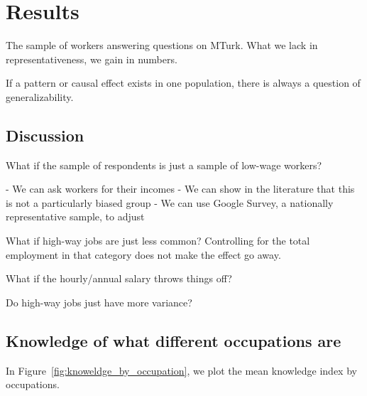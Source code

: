 \documentclass[11pt]{article}
\begin{document}

% 

\section{Results}

The sample of workers answering questions on MTurk. 
What we lack in representativeness, we gain in numbers. 

If a pattern or causal effect exists in one population, there is always a question of generalizability. 

\subsection{Discussion} 
What if the sample of respondents is just a sample of low-wage workers? 

- We can ask workers for their incomes 
- We can show in the literature that this is not a particularly biased group 
- We can use Google Survey, a nationally representative sample, to adjust 

What if high-way jobs are just less common?
Controlling for the total employment in that category does not make the effect go away. 

What if the hourly/annual salary throws things off? 

Do high-way jobs just have more variance? 

\subsection{Knowledge of what different occupations are} 

In Figure~\ref{fig:knoweldge_by_occupation}, we plot the mean knowledge index by occupations.  
\end{document}
